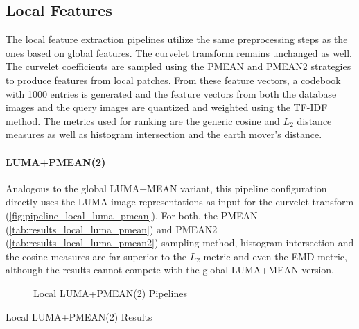 \subsection{Local Features}

The local feature extraction pipelines utilize the same preprocessing steps as
the ones based on global features. The curvelet transform remains unchanged as
well. The curvelet coefficients are sampled using the PMEAN and PMEAN2
strategies to produce features from local patches. From these feature vectors,
a codebook with 1000 entries is generated and the feature vectors from both the
database images and the query images are quantized and weighted using the
TF-IDF method. The metrics used for ranking are the generic cosine and $L_2$
distance measures as well as histogram intersection and the earth mover's
distance.

\paragraph{LUMA+PMEAN(2)}

Analogous to the global LUMA+MEAN variant, this pipeline configuration directly
uses the LUMA image representations as input for the curvelet transform
(\autoref{fig:pipeline_local_luma_pmean}). For both, the PMEAN
(\autoref{tab:results_local_luma_pmean}) and PMEAN2
(\autoref{tab:results_local_luma_pmean2}) sampling method, histogram
intersection and the cosine measures are far superior to the $L_2$ metric and
even the EMD metric, although the results cannot compete with the global
LUMA+MEAN version.

\begin{figure}[h]
    \centering
    
    \caption[Local LUMA+PMEAN(2) Pipelines]{
        Local LUMA+PMEAN(2) Pipelines
    }
    \label{fig:pipeline_local_luma_pmean}
\end{figure}

\begin{table}[h]
    \centering
    \quad
    \caption[Local LUMA+PMEAN(2) Results]{
        Local LUMA+PMEAN(2) Results
    }
    \label{tab:results_local_luma_pmean_all}
\end{table}

